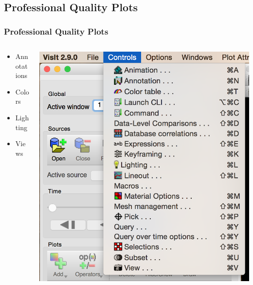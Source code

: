 
\subsection{Professional Quality Plots}
\begin{frame}
\frametitle{Professional Quality Plots}
\begin{columns}
\begin{column}{4cm}
\begin{itemize}
	\item Annotations
	\item Colors
	\item Lighting
	\item Views
\end{itemize}
\end{column}
\begin{column}{6cm}
	\includegraphics[width=\columnwidth]{figs/visit-guis/visit_ctrls}
\end{column}
\end{columns}
\end{frame}


